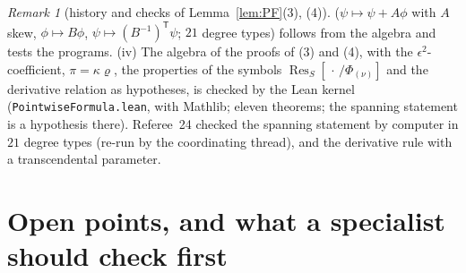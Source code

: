 \documentclass[11pt]{article}
\numberwithin{equation}{section}
\theoremstyle{remark}
\newtheorem{remark}[theorem]{Remark}
\newcommand{\Res}{\operatorname{Res}}
\newcommand{\T}{\mathsf{T}}
\begin{document}
\begin{remark}[history and checks of Lemma~\ref{lem:PF}(3), (4)]
($\psi\mapsto\psi+A\phi$ with $A$ skew, $\phi\mapsto B\phi$, $\psi\mapsto(B^{-1})^\T\psi$; $21$ degree types) follows
from the algebra and tests the programs. (iv) The algebra of the proofs of (3) and (4), with the
$\epsilon^2$-coefficient, $\pi=\kappa\varrho$, the properties of the symbols $\Res_S[\,\cdot\,/\Phi_{(\nu)}]$ and the
derivative relation as hypotheses, is checked by the Lean kernel (\texttt{PointwiseFormula.lean}, with Mathlib;
eleven theorems; the spanning statement is a hypothesis there). Referee~24 checked the spanning statement by
computer in $21$ degree types (re-run by the coordinating thread), and the derivative rule with a transcendental
parameter.
\end{remark}

\section{Open points, and what a specialist should check first}\label{sec:open}
\end{document}
